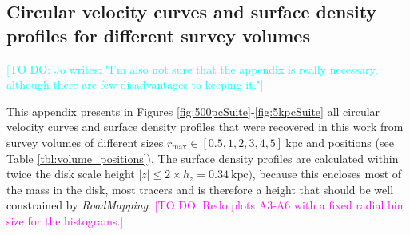 \documentclass[iop,revtex4,numberedappendix,appendixfloats]{emulateapj}
\newcommand{\RM}{{\sl RoadMapping}}
\newcommand{\Wilma}[1]{\textcolor{Magenta}{#1}}
\newcommand{\Jo}[1]{\textcolor{Cyan}{#1}}
\begin{document}
\begin{appendix}

\section{Circular velocity curves and surface density profiles for different survey volumes} \label{app:circsurf}

\Jo{[TO DO: Jo writes: "I'm also not sure that the appendix is really necessary, although there are few disadvantages to keeping it."]}

This appendix presents in Figures \ref{fig:500pcSuite}-\ref{fig:5kpcSuite} all circular velocity curves and surface density profiles that were recovered in this work from survey volumes of different sizes $r_\text{max} \in [0.5,1,2,3,4,5]~\text{kpc}$ and positions (see Table \ref{tbl:volume_positions}). The surface density profiles are calculated within twice the disk scale height $|z| \leq 2\times h_z=0.34~\text{kpc})$, because this encloses most of the mass in the disk, most tracers and is therefore a height that should be well constrained by \RM{}. \Wilma{[TO DO: Redo plots A3-A6 with a fixed radial bin size for the histograms.]}


\end{appendix}
\end{document}
